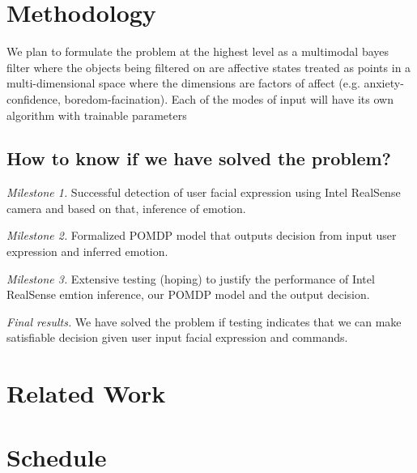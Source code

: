 \documentclass[12pt,letterpaper]{article}
\begin{document}
\section{Methodology}
We plan to formulate the problem at the highest level as a multimodal bayes filter where the objects being filtered on are affective states treated as points in a multi-dimensional space where the dimensions are factors of affect (e.g. anxiety-confidence, boredom-facination).  Each of the modes of input will have its own algorithm with trainable parameters 


\subsection{How to know if we have solved the problem?}
\emph{Milestone 1.} Successful detection of user facial expression using Intel RealSense camera and based on that, inference of emotion.

\emph{Milestone 2.} Formalized POMDP model that outputs decision from input user expression and inferred emotion.

\emph{Milestone 3.} Extensive testing (hoping) to justify the performance of Intel RealSense emtion inference, our POMDP model and the output decision.

\emph{Final results.} We have solved the problem if testing indicates that we can make satisfiable decision given user input facial expression and commands. 
\section{Related Work}



\newpage
\section{Schedule}
\end{document}
